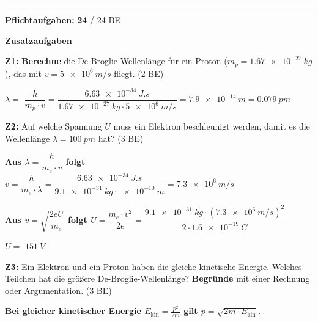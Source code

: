\documentclass[11pt,a4paper]{article}
\newcommand{\lsg}[1]{\textcolor{loesung}{\textbf{#1}}}
\begin{document}
\vspace{0.3em}

\begin{center}
\rule{8cm}{0.5pt}

\textbf{Pflichtaufgaben:} \lsg{24} / 24 BE
\end{center}

\vspace{0.5em}


{\large\textbf{Zusatzaufgaben}}

\vspace{0.3em}

\textbf{Z1:} \textbf{Berechne} die De-Broglie-Wellenlänge für ein Proton ($m_p = \SI{1,67e-27}{kg}$), das mit $v = \SI{5e6}{m/s}$ fliegt. \hfill (2 BE)

\vspace{0.3em}
$\lambda = $ \lsg{$\dfrac{h}{m_p \cdot v} = \dfrac{\SI{6,63e-34}{J.s}}{\SI{1,67e-27}{kg} \cdot \SI{5e6}{m/s}} = \SI{7,9e-14}{m} = \SI{0,079}{pm}$}

\vspace{0.5em}

\textbf{Z2:} Auf welche Spannung $U$ muss ein Elektron beschleunigt werden, damit es die Wellenlänge $\lambda = \SI{100}{pm}$ hat? \hfill (3 BE)

\vspace{0.3em}
\lsg{Aus $\lambda = \dfrac{h}{m_e \cdot v}$ folgt $v = \dfrac{h}{m_e \cdot \lambda} = \dfrac{\SI{6,63e-34}{J.s}}{\SI{9,1e-31}{kg} \cdot \SI{e-10}{m}} = \SI{7,3e6}{m/s}$}

\vspace{0.3em}
\lsg{Aus $v = \sqrt{\dfrac{2eU}{m_e}}$ folgt $U = \dfrac{m_e \cdot v^2}{2e} = \dfrac{\SI{9,1e-31}{kg} \cdot (\SI{7,3e6}{m/s})^2}{2 \cdot \SI{1,6e-19}{C}}$}

\vspace{0.3em}
$U = $ \lsg{$\SI{151}{V}$}

\vspace{0.5em}

\textbf{Z3:} Ein Elektron und ein Proton haben die gleiche kinetische Energie. Welches Teilchen hat die größere De-Broglie-Wellenlänge? \textbf{Begründe} mit einer Rechnung oder Argumentation. \hfill (3 BE)

\vspace{0.3em}
\lsg{Bei gleicher kinetischer Energie $E_{\text{kin}} = \frac{p^2}{2m}$ gilt $p = \sqrt{2m \cdot E_{\text{kin}}}$.}
\end{document}
